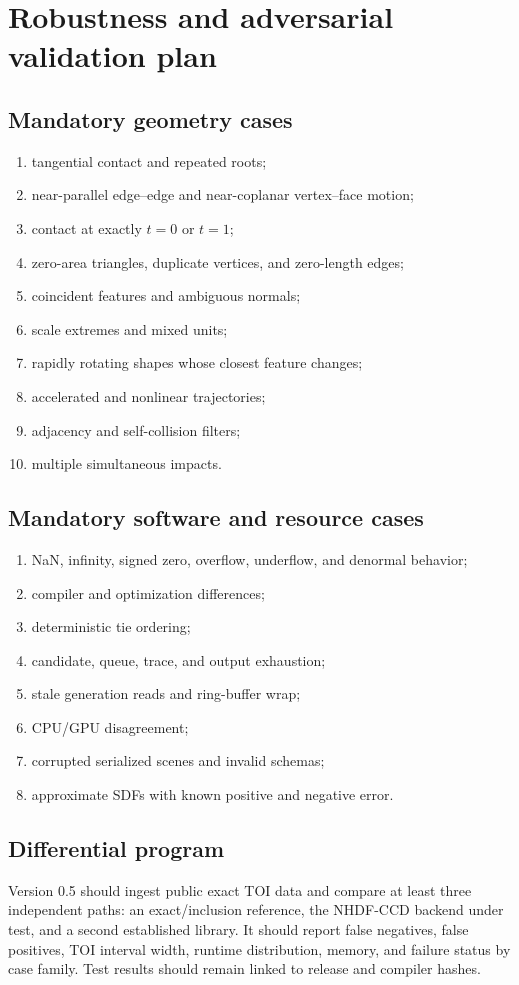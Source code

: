 \documentclass[11pt,a4paper,openany]{book}
\begin{document}
\chapter{Robustness and adversarial validation plan}
\section{Mandatory geometry cases}
\begin{enumerate}
  \item tangential contact and repeated roots;
  \item near-parallel edge--edge and near-coplanar vertex--face motion;
  \item contact at exactly $t=0$ or $t=1$;
  \item zero-area triangles, duplicate vertices, and zero-length edges;
  \item coincident features and ambiguous normals;
  \item scale extremes and mixed units;
  \item rapidly rotating shapes whose closest feature changes;
  \item accelerated and nonlinear trajectories;
  \item adjacency and self-collision filters;
  \item multiple simultaneous impacts.
\end{enumerate}

\section{Mandatory software and resource cases}
\begin{enumerate}
  \item NaN, infinity, signed zero, overflow, underflow, and denormal behavior;
  \item compiler and optimization differences;
  \item deterministic tie ordering;
  \item candidate, queue, trace, and output exhaustion;
  \item stale generation reads and ring-buffer wrap;
  \item CPU/GPU disagreement;
  \item corrupted serialized scenes and invalid schemas;
  \item approximate SDFs with known positive and negative error.
\end{enumerate}

\section{Differential program}
Version 0.5 should ingest public exact TOI data and compare at least three independent paths: an exact/inclusion reference, the NHDF-CCD backend under test, and a second established library. It should report false negatives, false positives, TOI interval width, runtime distribution, memory, and failure status by case family. Test results should remain linked to release and compiler hashes.
\end{document}
